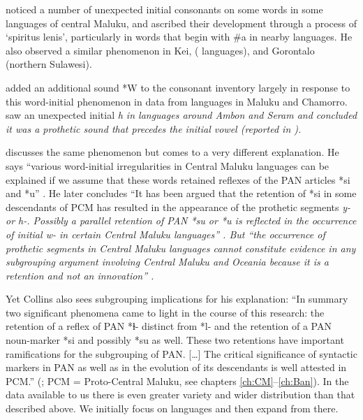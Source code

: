 \citet[114--118]{Stresemann1927} noticed a number of unexpected initial
consonants on some words in some languages of central Maluku,
and ascribed their development through a process of ‘spiritus
lenis’, particularly in words that begin with {\#}a in nearby languages.
He also observed a similar phenomenon in Kei,
 ( languages), and Gorontalo (northern Sulawesi).

\citet{Dyen1962} added an additional sound *W to the 
consonant inventory largely in response to this word-initial
phenomenon in data from languages in Maluku and Chamorro.
\citet{ChlenovSirk1973} saw an unexpected initial \it{h} in languages
around Ambon and Seram and concluded it was a prothetic sound that precedes
the initial vowel (reported in \citealp[121]{Collins1983}).

\citet[6, 120--128, 130f]{Collins1982d,Collins1983}
discusses the same phenomenon but comes to a very different explanation.
He says “various word-initial irregularities in Central Maluku
languages can be explained if we assume that these words retained
reflexes of the PAN articles *si and *u” \citep[6]{Collins1983}.
He later concludes “It has been argued that the retention of
 *si in some descendants of PCM has resulted in the
appearance of the prothetic segments \it{y-} or \it{h-}.
Possibly a parallel retention of PAN *su or *u is reflected in
the occurrence of initial \it{w-} in certain Central Maluku languages” \citep[130]{Collins1983}.
But “the occurrence of prothetic segments in Central Maluku languages
cannot constitute evidence in any subgrouping argument involving
Central Maluku and Oceania because it is a retention
and not an innovation” \citep[131]{Collins1983}.

Yet Collins also sees subgrouping implications for his explanation:
“In summary two significant phenomena came to light in the course
of this research: the retention of a reflex of PAN *ɫ- distinct
from *l- and the retention of a PAN noun-marker *si
and possibly *su as well.
These two retentions have important ramifications for the subgrouping of PAN.
[{\ldots}] The critical significance of syntactic markers in
PAN as well as in the evolution of its descendants is well attested
in PCM.” (\citet[131]{Collins1983}; PCM = Proto-Central Maluku,
see chapters \ref{ch:CM}--\ref{ch:Ban}).
In the data available to us there is even greater variety
and wider distribution than that described above.
We initially focus on  languages
and then expand from there.

